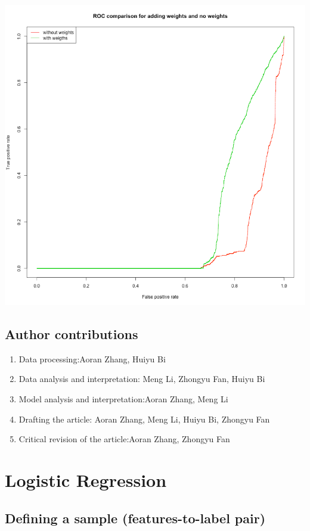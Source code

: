 \documentclass{article}
\begin{document}
\begin{spacing}{1}
\begin{large}
\includegraphics[scale = 0.8]{ROCwithandwithoutweights.png}

\subsection{Author contributions}
\begin{enumerate}
	\item
	Data processing:Aoran Zhang, Huiyu Bi
	\item
	Data analysis and interpretation: Meng Li, Zhongyu Fan, Huiyu Bi
	\item
	Model analysis and interpretation:Aoran Zhang, Meng Li
	\item
	Drafting the article: Aoran Zhang, Meng Li, Huiyu Bi, Zhongyu Fan
	\item
	Critical revision of the article:Aoran Zhang, Zhongyu Fan
	
\end{enumerate}

\section{Logistic Regression}

\subsection{Defining a sample (features-to-label pair)}


\end{large}
\end{spacing}
\end{document}
